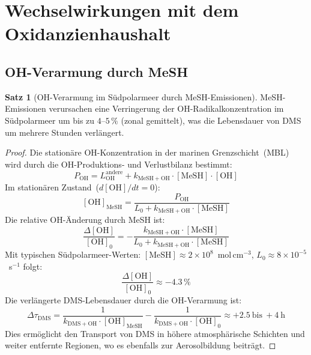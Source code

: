 ﻿\documentclass[a4paper,12pt]{article}
\theoremstyle{definition}
\newtheorem{satz}{Satz}
\begin{document}
\section{Wechselwirkungen mit dem Oxidanzienhaushalt}

\subsection{OH-Verarmung durch MeSH}

\begin{satz}[OH-Verarmung im Südpolarmeer durch MeSH-Emissionen]
  \label{satz:oh}
  MeSH-Emissionen verursachen eine Verringerung der OH-Radikalkonzentration im Südpolarmeer um
  bis zu $4$--$5\,\%$ (zonal gemittelt), was die Lebensdauer von DMS um mehrere Stunden verlängert.
\end{satz}

\begin{proof}
  Die stationäre OH-Konzentration in der marinen Grenzschicht~(MBL) wird durch die
  OH-Produktions- und Verlustbilanz bestimmt:
  \[
    P_{\mathrm{OH}} = L_{\mathrm{OH}}^{\mathrm{andere}} + k_{\mathrm{MeSH+OH}} \cdot [\mathrm{MeSH}] \cdot [\mathrm{OH}]
  \]
  Im stationären Zustand~($d[\mathrm{OH}]/dt = 0$):
  \[
    [\mathrm{OH}]_{\mathrm{MeSH}} = \frac{P_{\mathrm{OH}}}{L_0 + k_{\mathrm{MeSH+OH}} \cdot [\mathrm{MeSH}]}
  \]
  Die relative OH-Änderung durch MeSH ist:
  \[
    \frac{\Delta[\mathrm{OH}]}{[\mathrm{OH}]_0} = -\frac{k_{\mathrm{MeSH+OH}} \cdot [\mathrm{MeSH}]}{L_0 + k_{\mathrm{MeSH+OH}} \cdot [\mathrm{MeSH}]}
  \]
  Mit typischen Südpolarmeer-Werten: $[\mathrm{MeSH}] \approx 2 \times 10^8$~mol\,cm$^{-3}$,
  $L_0 \approx 8 \times 10^{-5}$~s$^{-1}$ folgt:
  \[
    \frac{\Delta[\mathrm{OH}]}{[\mathrm{OH}]_0} \approx -4.3\,\%
  \]
  Die verlängerte DMS-Lebensdauer durch die OH-Verarmung ist:
  \[
    \Delta\tau_{\mathrm{DMS}} = \frac{1}{k_{\mathrm{DMS+OH}} \cdot [\mathrm{OH}]_{\mathrm{MeSH}}} - \frac{1}{k_{\mathrm{DMS+OH}} \cdot [\mathrm{OH}]_0} \approx +2.5\ \text{bis}\ +4\ \text{h}
  \]
  Dies ermöglicht den Transport von DMS in höhere atmosphärische Schichten und weiter entfernte
  Regionen, wo es ebenfalls zur Aerosolbildung beiträgt. \qedhere
\end{proof}
\end{document}
